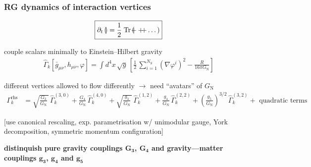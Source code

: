 \documentclass[]{beamer}  %
\newcommand\NS{ N_{\scriptscriptstyle{\mathrm{S}}} }
\newcommand\GNewton{ G_{\scriptscriptstyle{\mathrm{N}}}{} }
\begin{document}
\begin{frame}
  \frametitle{RG dynamics of interaction vertices}

  \begin{align*}
    \boxed{
      \partial_t
      \left(
        \hspace{-5pt}
        
        \hspace{2pt}
      \right)
      =
      \frac12 \;
      \mathrm{Tr}
      \left(
        \hspace{-5pt}
        
        + 
        +
        
        \hspace{-5pt}
        + \dots
      \right)
    }
  \end{align*}

  couple scalars minimally to Einstein--Hilbert gravity
  \begin{align*}
    \hat \Gamma_k[\bar g_{\mu\nu}, h_{\mu\nu}, \varphi] = \int d^4x \, \sqrt{g} \,
    \left[
      \frac{1}{2} \, \sum_{i=1}^{\NS} \left( \nabla\varphi^i \right)^2
      - \frac{R}{16 \pi \GNewton}
    \right]
  \end{align*}

  different vertices allowed to flow differently $\rightarrow$ need ``avatars'' of $\GNewton$
  \begin{align*}
    \Gamma_k^\mathrm{rhs} &=
    \sqrt{ \frac{G_3}{\GNewton} \, } \, \hat\Gamma^{(3,0)}_k
    + \frac{G_4}{\GNewton} \, \hat\Gamma^{(4,0)}_k
    + \sqrt{ \frac{g_3}{\GNewton} \, } \, \hat\Gamma^{(1,2)}_k
    + \frac{g_4}{ \GNewton} \, \hat\Gamma^{(2,2)}_k
    + \left(\frac{g_5}{ \GNewton}\right)^{3/2} \, \hat\Gamma^{(3,2)}_k
    + \mbox{ quadratic terms }
  \end{align*}

  \vspace{-5pt}
  \fontsize{6pt}{7.2}\selectfont
  \hfill [use canonical rescaling, exp. parametrisation w/ unimodular gauge,
  York decomposition, symmetric momentum configuration]

  \vspace{15pt}
  \fontsize{8pt}{7.2}\selectfont
  \begin{center}
    \textbf{
      distinquish pure gravity couplings $\mathbf{G_3}$, $\mathbf{G_4}$ and gravity---matter couplings
      $\mathbf{g_3}$, $\mathbf{g_4}$ and $\mathbf{g_5}$
    }
  \end{center}
\end{frame}
\end{document}
